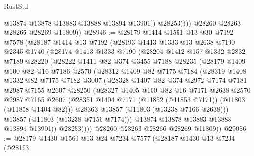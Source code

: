 \begin{lexlean}{RustStd}
\begin{coremodule}
                    @13874
                    @13878
                    @13883
                    @13888
                    @13894
                    @13901))
                @28253))))
        @28260
        @28263
        @28266
        @28269
        @11809))
@28946 := @28179
    @1414
    @1561
    @13
    @30
    @7192
    @7578
    (@28187
      @1414
      @13
      @7192
      (@28193
        @1413
        @1333
        @13
        @2638
        @7190
        @2345
        @1740
        (@28174
          @1413
          @1333
          @7190
          (@28204
            @1412
            @157
            @1332
            @2832
            @7189
            @28220
            (@28222
              @1411
              @82
              @374
              @3455
              @7188
              @28235
              (@28179
                @1409
                @100
                @82
                @16
                @7186
                @2570
                (@28312
                  @1409
                  @82
                  @7175
                  @7184
                  (@28319
                    @1408
                    @1332
                    @82
                    @7175
                    @7182
                    @3007
                    (@28328
                      @1407
                      @82
                      @374
                      @2972
                      @7174
                      @7181
                      @2987
                      @7155
                      @2607
                      @28250
                      (@28327
                        @1405
                        @100
                        @82
                        @16
                        @7171
                        @2638
                        @2570
                        @2987
                        @7165
                        @2607
                        (@28351 @1404 @7171 (@11852 (@11853 @7171)) (@11803 (@11858 @1404 @82)))
                        @28363
                        @13857
                        (@11803 (@13238 @7166 @2638)))
                      @13857
                      (@11803 (@13238 @7156 @7174)))
                    @13874
                    @13878
                    @13883
                    @13888
                    @13894
                    @13901))
                @28253))))
        @28260
        @28263
        @28266
        @28269
        @11809))
@29056 := @28179
    @1430
    @1560
    @13
    @24
    @7234
    @7577
    (@28187
      @1430
      @13
      @7234
      (@28193

\end{coremodule}
\end{lexlean}
